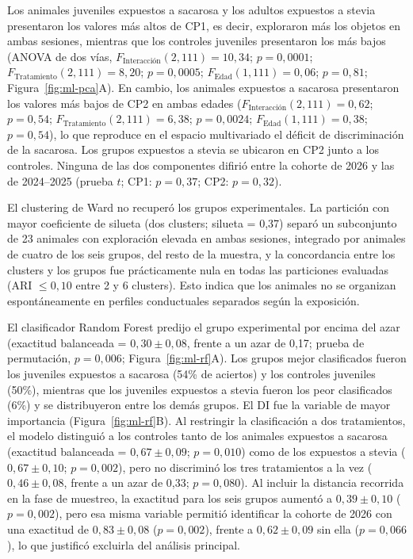 Los animales juveniles expuestos a sacarosa y los adultos expuestos a stevia presentaron los valores más altos de CP1, es decir, exploraron más los objetos en ambas sesiones, mientras que los controles juveniles presentaron los más bajos (ANOVA de dos vías, $F_{\text{Interacción}}(2, 111) = 10{,}34$; $p = 0{,}0001$; $F_{\text{Tratamiento}}(2, 111) = 8{,}20$; $p = 0{,}0005$; $F_{\text{Edad}}(1, 111) = 0{,}06$; $p = 0{,}81$; Figura~\ref{fig:ml-pca}A). En cambio, los animales expuestos a sacarosa presentaron los valores más bajos de CP2 en ambas edades ($F_{\text{Interacción}}(2, 111) = 0{,}62$; $p = 0{,}54$; $F_{\text{Tratamiento}}(2, 111) = 6{,}38$; $p = 0{,}0024$; $F_{\text{Edad}}(1, 111) = 0{,}38$; $p = 0{,}54$), lo que reproduce en el espacio multivariado el déficit de discriminación de la sacarosa. Los grupos expuestos a stevia se ubicaron en CP2 junto a los controles. Ninguna de las dos componentes difirió entre la cohorte de 2026 y las de 2024--2025 (prueba $t$; CP1: $p = 0{,}37$; CP2: $p = 0{,}32$).

El clustering de Ward no recuperó los grupos experimentales. La partición con mayor coeficiente de silueta (dos clusters; silueta = 0,37) separó un subconjunto de 23 animales con exploración elevada en ambas sesiones, integrado por animales de cuatro de los seis grupos, del resto de la muestra, y la concordancia entre los clusters y los grupos fue prácticamente nula en todas las particiones evaluadas (ARI $\leq 0{,}10$ entre 2 y 6 clusters). Esto indica que los animales no se organizan espontáneamente en perfiles conductuales separados según la exposición.

El clasificador Random Forest predijo el grupo experimental por encima del azar (exactitud balanceada = $0{,}30 \pm 0{,}08$, frente a un azar de 0,17; prueba de permutación, $p = 0{,}006$; Figura~\ref{fig:ml-rf}A). Los grupos mejor clasificados fueron los juveniles expuestos a sacarosa (54\% de aciertos) y los controles juveniles (50\%), mientras que los juveniles expuestos a stevia fueron los peor clasificados (6\%) y se distribuyeron entre los demás grupos. El DI fue la variable de mayor importancia (Figura~\ref{fig:ml-rf}B). Al restringir la clasificación a dos tratamientos, el modelo distinguió a los controles tanto de los animales expuestos a sacarosa (exactitud balanceada = $0{,}67 \pm 0{,}09$; $p = 0{,}010$) como de los expuestos a stevia ($0{,}67 \pm 0{,}10$; $p = 0{,}002$), pero no discriminó los tres tratamientos a la vez ($0{,}46 \pm 0{,}08$, frente a un azar de 0,33; $p = 0{,}080$). Al incluir la distancia recorrida en la fase de muestreo, la exactitud para los seis grupos aumentó a $0{,}39 \pm 0{,}10$ ($p = 0{,}002$), pero esa misma variable permitió identificar la cohorte de 2026 con una exactitud de $0{,}83 \pm 0{,}08$ ($p = 0{,}002$), frente a $0{,}62 \pm 0{,}09$ sin ella ($p = 0{,}066$), lo que justificó excluirla del análisis principal.


